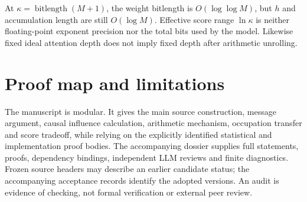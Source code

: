 \documentclass[11pt,letterpaper]{article}
\theoremstyle{definition}\newtheorem{definition}[theorem]{Definition}
\theoremstyle{remark}\newtheorem{remark}[theorem]{Remark}
\newcommand{\bl}{\operatorname{bitlength}}
\begin{document}
At $\kappa=\bl(M+1)$, the weight bitlength is $O(\log\log M)$, but $h$ and accumulation length are still $O(\log M)$. Effective score range $\ln\kappa$ is neither floating-point exponent precision nor the total bits used by the model. Likewise fixed ideal attention depth does not imply fixed depth after arithmetic unrolling.

\section{Proof map and limitations}\label{sec:map}
The manuscript is modular. It gives the main source construction, message argument, causal influence calculation, arithmetic mechanism, occupation transfer and score tradeoff, while relying on the explicitly identified statistical and implementation proof bodies. The accompanying dossier supplies full statements, proofs, dependency bindings, independent LLM reviews and finite diagnostics. Frozen source headers may describe an earlier candidate status; the accompanying acceptance records identify the adopted versions. An audit is evidence of checking, not formal verification or external peer review.
\end{document}
